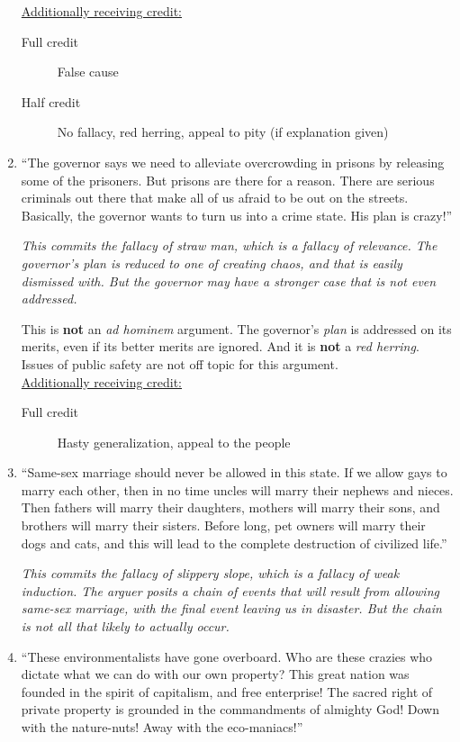 \documentclass[10pt]{article}
\begin{document}
\begin{enumerate}
  \underline{Additionally receiving credit:}
 \begin{description}
  \item [Full credit] False cause
  \item [Half credit] No fallacy, red herring, appeal to pity (if explanation given)
 \end{description}
  
  \item ``The governor says we need to alleviate overcrowding in prisons by releasing some of the prisoners.  But prisons are there for a reason.  There are serious criminals out there that make all of us afraid to be out on the streets.  Basically, the governor wants to turn us into a crime state. His plan is crazy!''

 \textit{This commits the fallacy of straw man, which is a fallacy of relevance.  The governor's plan is reduced to one of creating chaos, and that is easily dismissed with.  But the governor may have a stronger case that is not even addressed.}
 
 This is \textbf{not} an \textit{ad hominem} argument.  The governor's \textit{plan} is addressed on its merits, even if its better merits are ignored.  And it is \textbf{not} a \textit{red herring}.  Issues of public safety are not off topic for this argument.
 \\
  
  \underline{Additionally receiving credit:} 
 \begin{description}
  \item [Full credit] Hasty generalization, appeal to the people
 \end{description}
  
  \item ``Same-sex marriage should never be allowed in this state. If we allow gays to marry each other, then in no time uncles will marry their nephews and nieces. Then fathers will marry their daughters, mothers will marry their sons, and brothers will marry their sisters. Before long, pet owners will marry their dogs and cats, and this will lead to the complete destruction of civilized life.''
  
\textit{This commits the fallacy of slippery slope, which is a fallacy of weak induction.  The arguer posits a chain of events that will result from allowing same-sex marriage, with the final event leaving us in disaster.  But the chain is not all that likely to actually occur.}


  \item ``These environmentalists have gone overboard. Who are these crazies who dictate what we can do with our own property? This great nation was founded in the spirit of capitalism, and free enterprise! The sacred right of private property is grounded in the commandments of almighty God! Down with the nature-nuts! Away with the eco-maniacs!''
  

\end{enumerate}
\end{document}
